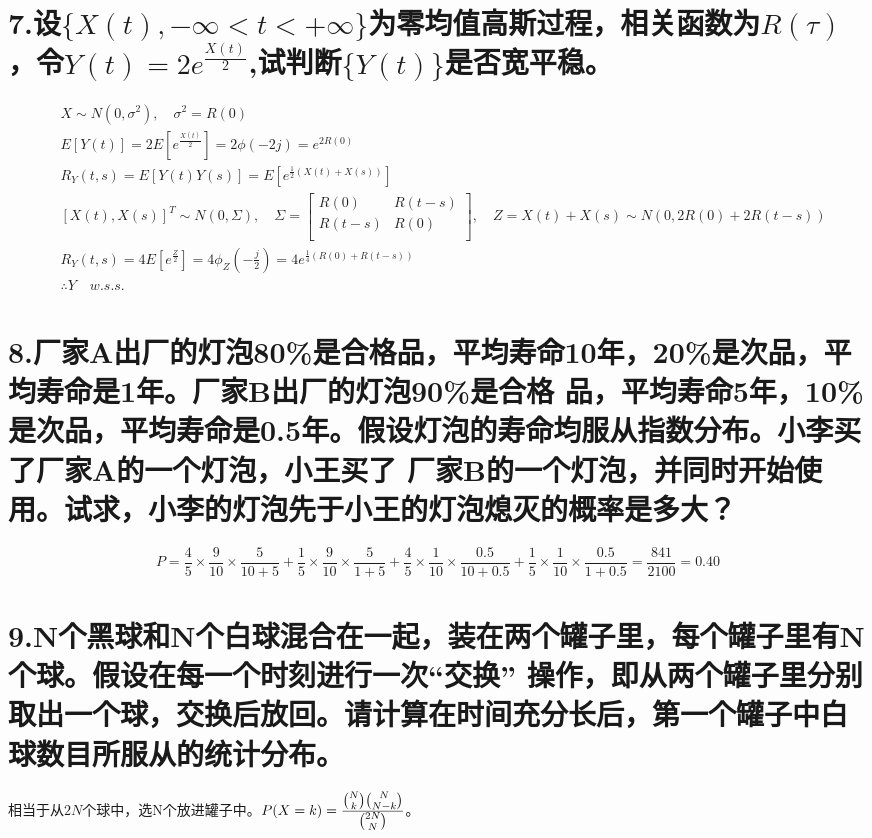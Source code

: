 \documentclass[UTF8]{ctexart}
\begin{document}
\section*{7.设$\{X(t),-\infty<t<+\infty\}$为零均值高斯过程，相关函数为$R(\tau)$，令$Y(t)=2e^\frac{X(t)}
    {2}$,试判断$\{Y(t)\}$是否宽平稳。}
\begin{equation*}
  \begin{aligned}
     & X\sim N(0,\sigma^2),\quad\sigma^2=R(0)                                         \\
     & E[Y(t)]=2E[e^{\frac{X(t)}{2}}]=2\phi(-2j)=e^{2R(0)}                            \\
     & R_Y(t,s)=E[Y(t)Y(s)]=E[e^{\frac{1}{2}(X(t)+X(s))}]                             \\
     & [X(t),X(s)]^T\sim N(0,\Sigma),\quad\Sigma=
    \begin{bmatrix}
      R(0)   & R(t-s) \\
      R(t-s) & R(0)   \\
    \end{bmatrix},\quad Z=X(t)+X(s)\sim N(0,2R(0)+2R(t-s))                \\
     & R_Y(t,s)=4E[e^\frac{Z}{2}]=4\phi_Z(-\frac{j}{2})=4e^{\frac{1}{4}(R(0)+R(t-s))} \\
     & \therefore Y\quad w.s.s.
  \end{aligned}
\end{equation*}
\section*{8.厂家A出厂的灯泡80\%是合格品，平均寿命10年，20\%是次品，平均寿命是1年。厂家B出厂的灯泡90\%是合格
  品，平均寿命5年，10\%是次品，平均寿命是0.5年。假设灯泡的寿命均服从指数分布。小李买了厂家A的一个灯泡，小王买了
  厂家B的一个灯泡，并同时开始使用。试求，小李的灯泡先于小王的灯泡熄灭的概率是多大？}
\begin{equation*}
  P=\frac{4}{5}\times\frac{9}{10}\times\frac{5}{10+5}
  +\frac{1}{5}\times\frac{9}{10}\times\frac{5}{1+5}
  +\frac{4}{5}\times\frac{1}{10}\times\frac{0.5}{10+0.5}
  +\frac{1}{5}\times\frac{1}{10}\times\frac{0.5}{1+0.5}
  =\frac{841}{2100}=0.40
\end{equation*}
\section*{9.N个黑球和N个白球混合在一起，装在两个罐子里，每个罐子里有N个球。假设在每一个时刻进行一次“交换”
  操作，即从两个罐子里分别取出一个球，交换后放回。请计算在时间充分长后，第一个罐子中白球数目所服从的统计分布。}
相当于从$2N$个球中，选N个放进罐子中。$P(X=k)=\frac{\tbinom{N}{k}\tbinom{N}{N-k}}{\tbinom{2N}{N}}$。
\end{document}
